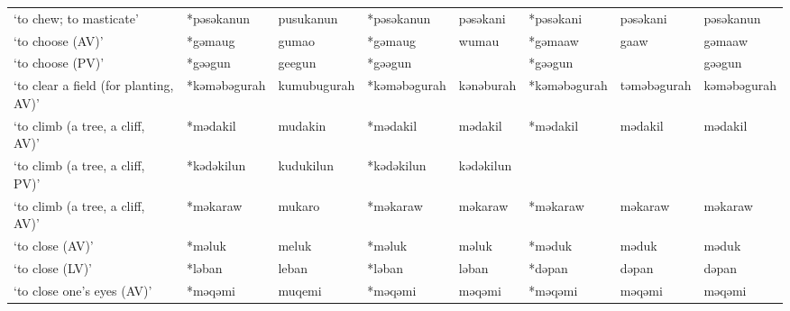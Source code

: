 \begin{landscape}
\begin{longtable}[c]{@{}p{3cm}<{\raggedright}p{2.75cm}<{\raggedright}p{2.75cm}<{\raggedright}p{2.75cm}<{\raggedright}p{2.75cm}<{\raggedright}p{2.75cm}<{\raggedright}p{2.75cm}<{\raggedright}p{2.75cm}<{\raggedright}@{}}
`to chew; to masticate'                              & *pəsəkanun         & pusukanun                      & *pəsəkanun         & pəsəkani                   & *pəsəkani        & pəsəkani                 & pəsəkanun                         \\
`to choose (AV)'                                     & *gəmaug            & gumao                          & *gəmaug            & wumau                      & *gəmaaw          & gaaw                     & gəmaaw                            \\
`to choose (PV)'                                     & *gəəgun            & geegun                         & *gəəgun            &                            & *gəəgun          &                          & gəəgun                            \\
`to clear a field (for planting, AV)'                & *kəməbəgurah       & kumubugurah                    & *kəməbəgurah       & kənəburah                  & *kəməbəgurah     & təməbəgurah              & kəməbəgurah                       \\
`to climb (a tree, a cliff, AV)'                     & *mədakil           & mudakin                        & *mədakil           & mədakil                    & *mədakil         & mədakil                  & mədakil                           \\
`to climb (a tree, a cliff, PV)'                     & *kədəkilun         & kudukilun                      & *kədəkilun         & kədəkilun                  &                  &                          &                                   \\
`to climb (a tree, a cliff, AV)'                     & *məkaraw           & mukaro                         & *məkaraw           & məkaraw                    & *məkaraw         & məkaraw                  & məkaraw                           \\
`to close (AV)'                                      & *məluk             & meluk                          & *məluk             & məluk                      & *məduk           & məduk                    & məduk                             \\
`to close (LV)'                                      & *ləban             & leban                          & *ləban             & ləban                      & *dəpan           & dəpan                    & dəpan                             \\
`to close one's eyes (AV)'                           & *məqəmi            & muqemi                         & *məqəmi            & məqəmi                     & *məqəmi          & məqəmi                   & məqəmi                            \\

\end{longtable}
\end{landscape}
